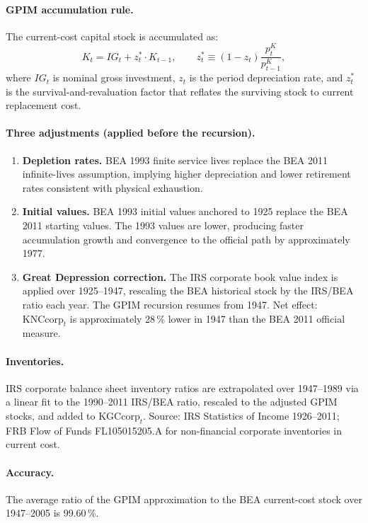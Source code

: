 \paragraph{GPIM accumulation rule.}
The current-cost capital stock is accumulated as:
%
\begin{equation}
\label{eq:app_gpim}
K_t = IG_t + z_t^* \cdot K_{t-1},
\qquad
z_t^* \equiv (1 - z_t)\frac{p^K_t}{p^K_{t-1}},
\end{equation}
%
where $IG_t$ is nominal gross investment, $z_t$ is the period depreciation rate, and $z_t^*$ is the survival-and-revaluation factor that reflates the surviving stock to current replacement cost.

\paragraph{Three adjustments (applied before the recursion).}
\begin{enumerate}
\item \textbf{Depletion rates.} BEA 1993 finite service lives replace the BEA 2011 infinite-lives assumption, implying higher depreciation and lower retirement rates consistent with physical exhaustion.
\item \textbf{Initial values.} BEA 1993 initial values anchored to 1925 replace the BEA 2011 starting values. The 1993 values are lower, producing faster accumulation growth and convergence to the official path by approximately 1977.
\item \textbf{Great Depression correction.} The IRS corporate book value index \citep[Series~V~115, pp.~924--926]{UScensus1975} is applied over 1925--1947, rescaling the BEA historical stock by the IRS/BEA ratio each year. The GPIM recursion resumes from 1947. Net effect: $\text{KNCcorp}_t$ is approximately 28\,\% lower in 1947 than the BEA 2011 official measure.
\end{enumerate}

\paragraph{Inventories.}
IRS corporate balance sheet inventory ratios are extrapolated over 1947--1989 via a linear fit to the 1990--2011 IRS/BEA ratio, rescaled to the adjusted GPIM stocks, and added to $\text{KGCcorp}_t$. Source: IRS Statistics of Income 1926--2011; FRB Flow of Funds FL105015205.A for non-financial corporate inventories in current cost.

\paragraph{Accuracy.}
The average ratio of the GPIM approximation to the BEA current-cost stock over 1947--2005 is 99.60\,\%.

